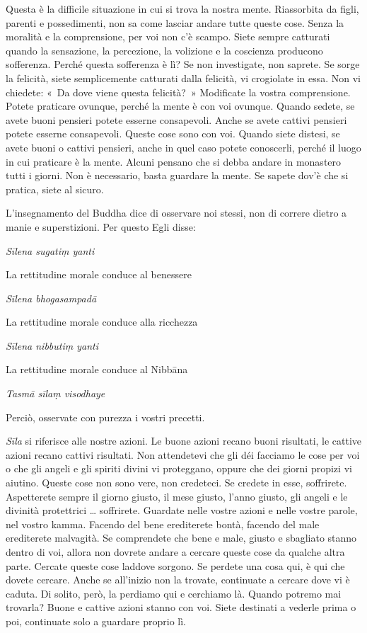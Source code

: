 Questa è la difficile situazione in cui si trova la nostra mente.
Riassorbita da figli, parenti e possedimenti, non sa come lasciar andare
tutte queste cose. Senza la moralità e la comprensione, per voi non c'è
scampo. Siete sempre catturati quando la sensazione, la percezione, la
volizione e la coscienza producono sofferenza. Perché questa sofferenza
è lì? Se non investigate, non saprete. Se sorge la felicità, siete
semplicemente catturati dalla felicità, vi crogiolate in essa. Non vi
chiedete: «~Da dove viene questa felicità?~» Modificate la vostra
comprensione. Potete praticare ovunque, perché la mente è con voi
ovunque. Quando sedete, se avete buoni pensieri potete esserne
consapevoli. Anche se avete cattivi pensieri potete esserne consapevoli.
Queste cose sono con voi. Quando siete distesi, se avete buoni o cattivi
pensieri, anche in quel caso potete conoscerli, perché il luogo in cui
praticare è la mente. Alcuni pensano che si debba andare in monastero
tutti i giorni. Non è necessario, basta guardare la mente. Se sapete
dov'è che si pratica, siete al sicuro.

L'insegnamento del Buddha dice di osservare noi stessi, non di correre
dietro a manie e superstizioni. Per questo Egli disse:

\emph{Sīlena sugatiṃ yanti}

La rettitudine morale conduce al benessere

\emph{Sīlena bhogasampadā}

La rettitudine morale conduce alla ricchezza

\emph{Sīlena nibbutiṃ yanti}

La rettitudine morale conduce al Nibbāna

\emph{Tasmā sīlaṃ visodhaye}

Perciò, osservate con purezza i vostri precetti.

\emph{Sīla} si riferisce alle nostre azioni. Le buone azioni recano
buoni risultati, le cattive azioni recano cattivi risultati. Non
attendetevi che gli déi facciamo le cose per voi o che gli angeli e gli
spiriti divini vi proteggano, oppure che dei giorni propizi vi aiutino.
Queste cose non sono vere, non credeteci. Se credete in esse,
soffrirete. Aspetterete sempre il giorno giusto, il mese giusto, l'anno
giusto, gli angeli e le divinità protettrici \ldots{} soffrirete. Guardate
nelle vostre azioni e nelle vostre parole, nel vostro kamma.
Facendo del bene erediterete bontà, facendo del male erediterete
malvagità. Se comprendete che bene e male, giusto e sbagliato stanno
dentro di voi, allora non dovrete andare a cercare queste cose da
qualche altra parte. Cercate queste cose laddove sorgono. Se perdete una
cosa qui, è qui che dovete cercare. Anche se all'inizio non la trovate,
continuate a cercare dove vi è caduta. Di solito, però, la perdiamo qui
e cerchiamo là. Quando potremo mai trovarla? Buone e cattive azioni
stanno con voi. Siete destinati a vederle prima o poi, continuate solo a
guardare proprio lì.

